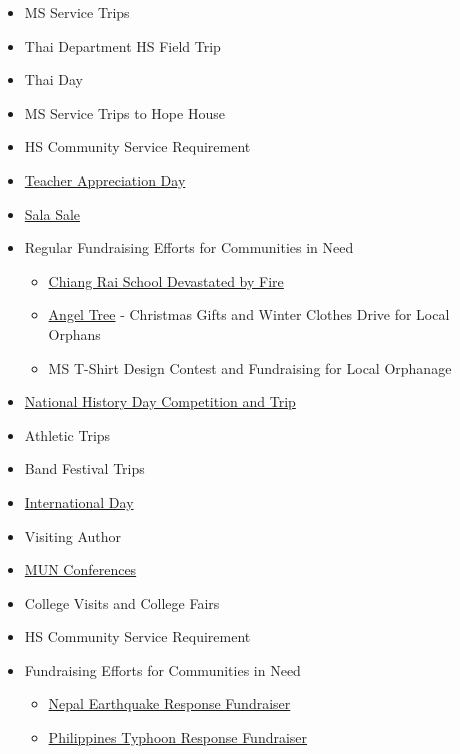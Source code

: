 \begin{findings}
\begin{itemize}
\item MS Service Trips
\item Thai Department HS Field Trip
\item Thai Day
\item MS Service Trips to Hope House
\item HS Community Service Requirement
\item \href{https://www.youtube.com/watch?v=3Mb6RadmBkA}{Teacher Appreciation Day}
\item \href{http://blogs.cmis.ac.th/newsletter/2015/05/08/cmis-sala-sale-saturday-may-16th/}{Sala Sale}
\item Regular Fundraising Efforts for Communities in Need
\begin{itemize}
\item \href{http://blogs.cmis.ac.th/newsletter/2016/06/07/wow-thank-you-for-your-donations-pitakkiat-school-chiang-rai-update/}{Chiang Rai School Devastated by Fire}
\item \href{http://blogs.cmis.ac.th/newsletter/2016/11/07/angel-tree-project-2016-help-make-christmas-better-for-children/}{Angel Tree} - Christmas Gifts and Winter Clothes Drive for Local Orphans
\item MS T-Shirt Design Contest and Fundraising for Local Orphanage
\end{itemize}
\end{itemize}

\begin{itemize}
\item \href{http://blogs.cmis.ac.th/newsletter/2016/03/21/cmis-student-take-top-awards-in-the-south-asia-division-of-the-national-history-day-competition/}{National History Day Competition and Trip}
\item Athletic Trips
\item Band Festival Trips
\item \href{http://blogs.cmis.ac.th/newsletter/2016/02/05/cmis-international-day-friday-february-19/}{International Day}
\item Visiting Author
\item \href{http://gallery.cmis.ac.th/2016-2017/MUN/}{MUN Conferences}
\item College Visits and College Fairs
\item HS Community Service Requirement
\item Fundraising Efforts for Communities in Need
\begin{itemize}
\item \href{http://blogs.cmis.ac.th/newsletter/2015/06/05/elementary-school-fundraiser-for-nepal-raises-30000-baht/}{Nepal Earthquake Response Fundraiser}
\item\href{http://blogs.cmis.ac.th/newsletter/2014/02/07/cmis-fundraising-for-typhoon-haiyan-victims/}{ Philippines Typhoon Response Fundraiser}
\end{itemize}
\end{itemize}


\end{findings}
